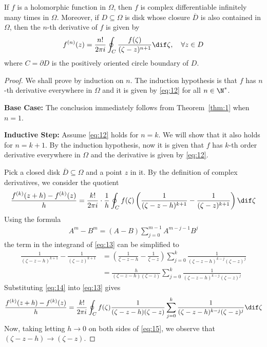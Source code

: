 \documentclass[thmcnt=section, color=cyan, 12pt]{my-elegantbook}
\begin{document}
\begin{corollary}
	If $f$ is a holomorphic function in $\Omega$,
	then $f$ is complex differentiable infinitely many times
	in $\Omega$.
	Moreover, if $D \subseteq \Omega$
	is disk whose closure $\overline{D}$ is also contained in $\Omega$,
	then the $n$-th derivative of $f$ is given by
	\begin{align}
		f^{(n)}(z) = \frac{n!}{2 \pi i} \oint_C \frac{f(\zeta)}{(\zeta - z)^{n+1}} \dif \zeta, \quad \forall z \in D
		\label{eq:12}
	\end{align}
	where $C = \partial D$ is the positively oriented circle boundary of $D$.
\end{corollary}

\begin{proof}
	We shall prove by induction on $n$.
	The induction hypothesis is
	that $f$ has $n$-th derivative everywhere in $\Omega$
	and it is given by \eqref{eq:12} for all $n \in \N^\ast$.

	\noindent\textbf{Base Case:} The conclusion immediately follows
	from Theorem~\ref{thm:1} when $n=1$.

	\noindent\textbf{Inductive Step:} Assume \eqref{eq:12} holds
	for $n=k$. We will show that it also holds for $n=k+1$.
	By the induction hypothesis, now it is given that $f$ has $k$-th order derivative
	everywhere in $\Omega$ and the derivative is given by \eqref{eq:12}.

	Pick a closed disk $\overline{D} \subseteq \Omega$ and a point $z$ in it.
	By the definition of complex derivatives, we consider the quotient
	\begin{align}
		\frac{f^{(k)}(z+h) - f^{(k)}(z)}{h}
		= \frac{k!}{2 \pi i} \cdot \frac{1}{h} \oint_C f(\zeta) \left(
		\frac{1}{(\zeta - z - h)^{k+1}} - \frac{1}{(\zeta - z)^{k+1}}
		\right) \dif \zeta
		\label{eq:13}
	\end{align}
	Using the formula
	\begin{align*}
		A^m - B^m = (A - B) \sum_{j=0}^{m-1} A^{m-j-1} B^j
	\end{align*}
	the term in the integrand of \eqref{eq:13} can be simplified to
	\begin{align}
		\frac{1}{(\zeta - z - h)^{k+1}} - \frac{1}{(\zeta - z)^{k+1}}
		 & = \left( \frac{1}{\zeta - z - h} - \frac{1}{\zeta - z} \right)
		\sum_{j=0}^{k} \frac{1}{(\zeta - z - h)^{k-j} (\zeta - z)^j}                                          \nonumber \\
		 & = \frac{h}{(\zeta - z - h)(\zeta - z)} \sum_{j=0}^{k} \frac{1}{(\zeta - z - h)^{k-j} (\zeta - z)^j}
		\label{eq:14}
	\end{align}
	Substituting \eqref{eq:14} into \eqref{eq:13} gives
	\begin{align}
		\frac{f^{(k)}(z+h) - f^{(k)}(z)}{h}
		= \frac{k!}{2 \pi i} \oint_C f(\zeta)
		\frac{1}{(\zeta - z - h)(\zeta - z)} \sum_{j=0}^{k} \frac{1}{(\zeta - z - h)^{k-j} (\zeta - z)^j}
		\dif \zeta
		\label{eq:15}
	\end{align}
	Now, taking letting $h \to 0$ on both sides of \eqref{eq:15},
	we observe that $(\zeta - z - h) \to (\zeta - z)$.


\end{proof}
\end{document}
